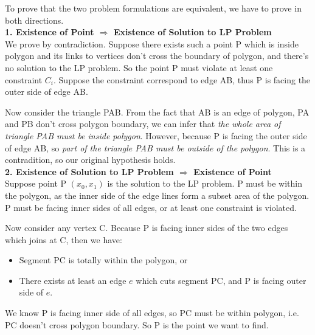 To prove that the two problem formulations are equivalent, we have to prove in both directions.\\

\textbf{1. Existence of Point $\Rightarrow$ Existence of Solution to LP Problem }\\

We prove by contradiction. Suppose there exists such a point P which is inside polygon and its links to vertices don't cross the boundary of polygon, and there's no solution to the LP problem. So the point P must violate at least one constraint $C_i$. Suppose the constraint correspond to edge AB, thus P is facing the outer side of edge AB.

Now consider the triangle PAB. From the fact that AB is an edge of polygon, PA and PB don't cross polygon boundary, we can infer that \textit{the whole area of triangle PAB must be inside polygon}. However, because P is facing the outer side of edge AB, so \textit{part of the triangle PAB must be outside of the polygon}. This is a contradition, so our original hypothesis holds. \\

\textbf{2. Existence of Solution to LP Problem $\Rightarrow$ Existence of Point }\\

Suppose point P $(x_0, x_1)$ is the solution to the LP problem. P must be within the polygon, as the inner side of the edge lines form a subset area of the polygon. P must be facing inner sides of all edges, or at least one constraint is violated.

Now consider any vertex C. Because P is facing inner sides of the two edges which joins at C, then we have:

\begin{itemize}
\item Segment PC is totally within the polygon, or
\item There exists at least an edge $e$ which cuts segment PC, and P is facing outer side of $e$.
\end{itemize}

We know P is facing inner side of all edges, so PC must be within polygon, i.e. PC doesn't cross polygon boundary. So P is the point we want to find.
